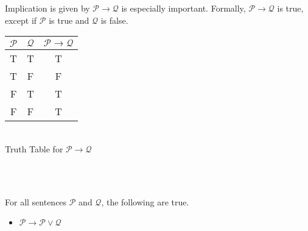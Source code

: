 \documentclass[../base/set_theory.tex]{subfiles}
\begin{document}
\\\\
Implication is given by $\mathcal{P}\to \mathcal{Q}$ is especially important.
Formally, $\mathcal{P}\to \mathcal{Q}$ is true, except if $\mathcal{P}$ is true 
and $\mathcal{Q}$ is false.\\
\begin{center}
    \begin{tabular}{c|c|c}
    $\mathcal{P}$ & $\mathcal{Q}$ & $\mathcal{P}\to \mathcal{Q}$ \\ \hline
    T & T & T \\ 
    T & F & F \\ 
    F & T & T \\  
    F & F & T \\
    \end{tabular}
    \\[10pt]
    \caption{Truth Table for $\mathcal{P}\to \mathcal{Q}$}
\end{center}
\\\\
\begin{myThm}
For all sentences $\mathcal{P}$ and $\mathcal{Q}$, the following are true.
\begin{itemize}
    \item $\mathcal{P}\to \mathcal{P}\lor \mathcal{Q}$
\end{itemize}
\end{myThm}
\end{document}
